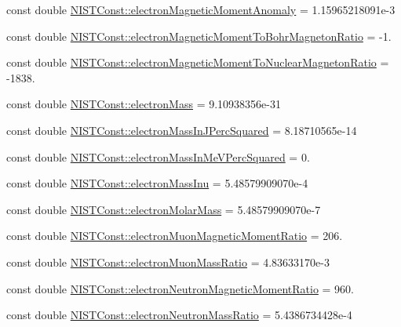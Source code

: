 \begin{DoxyCompactItemize}
const double \mbox{\hyperlink{group___n_i_s_t_const-_electron_gaf1a0633191464e7a695240858b9b407c}{N\+I\+S\+T\+Const\+::electron\+Magnetic\+Moment\+Anomaly}} = 1.\+15965218091e-\/3
\item 
const double \mbox{\hyperlink{group___n_i_s_t_const-_electron_ga921889f482e157189bf19818e428532f}{N\+I\+S\+T\+Const\+::electron\+Magnetic\+Moment\+To\+Bohr\+Magneton\+Ratio}} = -\/1.
\item 
const double \mbox{\hyperlink{group___n_i_s_t_const-_electron_ga2c0f984bb3ae4dd8ca2696d4fec8f9bf}{N\+I\+S\+T\+Const\+::electron\+Magnetic\+Moment\+To\+Nuclear\+Magneton\+Ratio}} = -\/1838.
\item 
const double \mbox{\hyperlink{group___n_i_s_t_const-_electron_ga2c9773ce81cfbe85e9042adccd788589}{N\+I\+S\+T\+Const\+::electron\+Mass}} = 9.\+10938356e-\/31
\item 
const double \mbox{\hyperlink{group___n_i_s_t_const-_electron_gad128828903af19e91fdc1a95ef9cbb24}{N\+I\+S\+T\+Const\+::electron\+Mass\+In\+J\+Perc\+Squared}} = 8.\+18710565e-\/14
\item 
const double \mbox{\hyperlink{group___n_i_s_t_const-_electron_ga6a41b7cbd78c00ef17e9b17944ab5f5c}{N\+I\+S\+T\+Const\+::electron\+Mass\+In\+Me\+V\+Perc\+Squared}} = 0.
\item 
const double \mbox{\hyperlink{group___n_i_s_t_const-_electron_gaa6fc2ab3a81cd61f6d78d64eec8a670d}{N\+I\+S\+T\+Const\+::electron\+Mass\+Inu}} = 5.\+48579909070e-\/4
\item 
const double \mbox{\hyperlink{group___n_i_s_t_const-_electron_gaebecd54c70326d72d25d790c0ab62145}{N\+I\+S\+T\+Const\+::electron\+Molar\+Mass}} = 5.\+48579909070e-\/7
\item 
const double \mbox{\hyperlink{group___n_i_s_t_const-_electron_gacd4a3b462095f6b3ec3de099a34b9726}{N\+I\+S\+T\+Const\+::electron\+Muon\+Magnetic\+Moment\+Ratio}} = 206.
\item 
const double \mbox{\hyperlink{group___n_i_s_t_const-_electron_ga6b6bb303de5ee3bd95d18e8024880eea}{N\+I\+S\+T\+Const\+::electron\+Muon\+Mass\+Ratio}} = 4.\+83633170e-\/3
\item 
const double \mbox{\hyperlink{group___n_i_s_t_const-_electron_ga556c66115bf01b011616c5675e8b33c1}{N\+I\+S\+T\+Const\+::electron\+Neutron\+Magnetic\+Moment\+Ratio}} = 960.
\item 
const double \mbox{\hyperlink{group___n_i_s_t_const-_electron_gad051ac865a63e667306850054f912ab1}{N\+I\+S\+T\+Const\+::electron\+Neutron\+Mass\+Ratio}} = 5.\+4386734428e-\/4

\end{DoxyCompactItemize}
